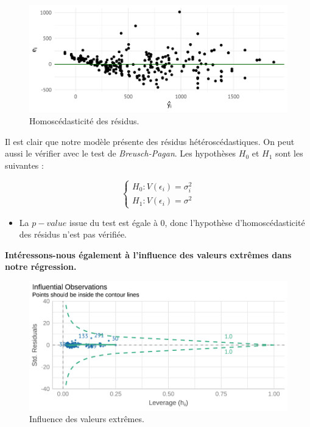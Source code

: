 \documentclass[
  12pt,
]{report}
\providecommand{\tightlist}{%
  \setlength{\itemsep}{0pt}\setlength{\parskip}{0pt}}\usepackage{longtable,booktabs,array}
\begin{document}
\begin{figure}[H]

{\centering \includegraphics{report_files/figure-pdf/level_hetero-1.pdf}

}

\caption{Homoscédasticité des résidus.}

\end{figure}%

Il est clair que notre modèle présente des résidus hétéroscédastiques.
On peut aussi le vérifier avec le test de \emph{Breusch-Pagan}. Les
hypothèses \(H_0\) et \(H_1\) sont les suivantes :

\[
\begin{cases}
H_0 : V(\epsilon_i) = \sigma^2_i\\
H_1 : V(\epsilon_i) = \sigma^2
\end{cases}
\]

\vspace{1em}

\begin{itemize}
\tightlist
\item
  La \(p-value\) issue du test est égale à 0, donc l'hypothèse
  d'homoscédasticité des résidus n'est pas vérifiée.
\end{itemize}

\textbf{Intéressons-nous également à l'influence des valeurs extrêmes
dans notre régression.}

\begin{figure}[H]

{\centering \includegraphics{report_files/figure-pdf/outliers_level-1.pdf}

}

\caption{Influence des valeurs extrêmes.}

\end{figure}%
\end{document}
